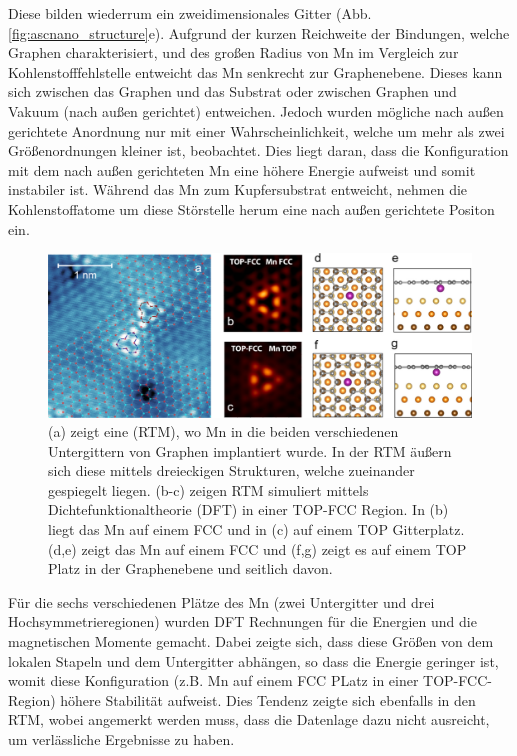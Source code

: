 Diese bilden wiederrum ein zweidimensionales Gitter (Abb. \ref{fig:ascnano_structure}e).
Aufgrund der kurzen Reichweite der Bindungen, welche Graphen charakterisiert, und des großen Radius von Mn im Vergleich zur 
Kohlenstofffehlstelle entweicht das Mn senkrecht zur Graphenebene.
Dieses kann sich zwischen das Graphen und das Substrat oder zwischen Graphen und Vakuum (nach außen gerichtet) entweichen. 
Jedoch wurden mögliche nach außen gerichtete Anordnung nur mit einer Wahrscheinlichkeit, 
welche um mehr als zwei Größenordnungen kleiner ist, beobachtet.
Dies liegt daran, dass die Konfiguration mit dem nach außen gerichteten Mn eine höhere Energie aufweist und somit instabiler ist.
Während das Mn zum Kupfersubstrat entweicht, nehmen die Kohlenstoffatome um diese Störstelle herum eine nach außen gerichtete Positon ein.
\begin{figure}
    \centering
    \includegraphics[width = \textwidth]{Plots/images_large_nn1c00139_0003.jpeg}
    \caption{(a) zeigt eine (RTM), wo Mn in die beiden verschiedenen Untergittern von Graphen implantiert wurde. In der
    RTM äußern sich diese mittels dreieckigen Strukturen, welche zueinander gespiegelt liegen.
    (b-c) zeigen RTM simuliert mittels Dichtefunktionaltheorie (DFT) in einer TOP-FCC Region. In (b) liegt das Mn auf einem FCC
    und in (c) auf einem TOP Gitterplatz. (d,e) zeigt das Mn auf einem FCC und (f,g) zeigt es auf einem TOP Platz in der Graphenebene und seitlich davon.}
    \label{fig:ascnano_defect}
\end{figure}
Für die sechs verschiedenen Plätze des Mn (zwei Untergitter und drei Hochsymmetrieregionen) wurden DFT Rechnungen für die Energien und die magnetischen Momente gemacht.
Dabei zeigte sich, dass diese Größen von dem lokalen Stapeln und dem Untergitter abhängen, so dass die Energie geringer ist, womit 
diese Konfiguration (z.B. Mn auf einem FCC PLatz in einer TOP-FCC-Region) höhere Stabilität aufweist.
Dies Tendenz zeigte sich ebenfalls in den RTM, wobei angemerkt werden muss, dass die Datenlage dazu nicht ausreicht, um
verlässliche Ergebnisse zu haben.  
\newpage
\FloatBarrier
